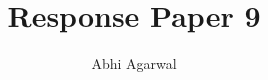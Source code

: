 \documentclass[11pt, oneside]{article}
\title{Response Paper 9}
\author{Abhi Agarwal}
\date{}
\begin{document}
\maketitle

\par 
\end{document}
